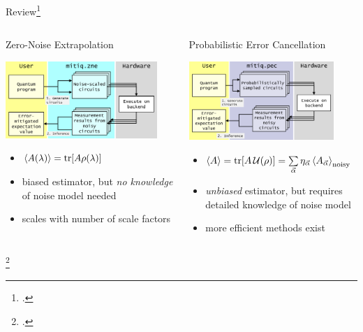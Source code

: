 \documentclass[11pt,aspectratio=1610,xcolor=dvipsnames]{beamer}
\begin{document}
\begin{frame}{Review\footcite{zne-pec}}
	\begin{columns}
		\begin{column}[T]{0.5\textwidth}
			{\Large Zero-Noise Extrapolation}%
			\begin{center}
				\includegraphics[width=0.9\textwidth]{zne_workflow}
			\end{center}
			\begin{itemize}
				\item $\expval{A(\lambda)} = \tr\!\qty[A \rho(\lambda)]$
				\item biased estimator, but \emph{no knowledge} of noise model needed
				\item scales with number of scale factors
			\end{itemize}
		\end{column}
		\begin{column}[T]{0.5\textwidth}
			{\Large Probabilistic Error Cancellation}
			\begin{center}
				\includegraphics[width=0.86\textwidth]{pec_workflow}
			\end{center}
			\begin{itemize}
				\item $\expval{A} = \tr\!\qty[A \, \mathcal{U}(\rho)] = \sum\limits_{\vec{\alpha}} \eta_{\vec{\alpha}} \expval{A_{\vec{\alpha}}}_\text{noisy}$
				\item \emph{unbiased} estimator, but requires detailed knowledge of noise model
				\item more efficient methods exist\footnotemark
			\end{itemize}
		\end{column}
	\end{columns}
	\footcitetext{automated-per}
\end{frame}
\end{document}
